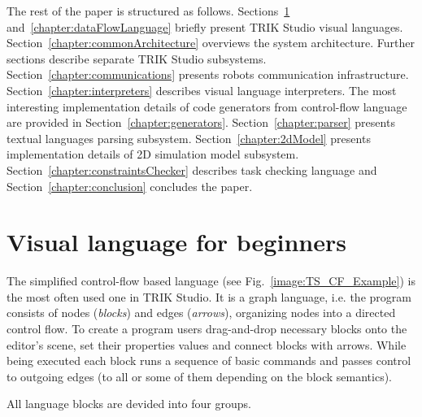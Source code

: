 \documentclass[conference]{IEEEtran}
\begin{document}
The rest of the paper is structured as follows. Sections~\ref{chapter:controlFlowLanguage} and~\ref{chapter:dataFlowLanguage} briefly present TRIK Studio visual languages. Section~\ref{chapter:commonArchitecture} overviews the system architecture. Further sections describe separate TRIK Studio subsystems. Section~\ref{chapter:communications} presents robots communication infrastructure. Section~\ref{chapter:interpreters} describes visual language interpreters. The most interesting implementation details of code generators from control-flow language are provided in Section~\ref{chapter:generators}. Section~\ref{chapter:parser} presents textual languages parsing subsystem. Section~\ref{chapter:2dModel} presents implementation details of 2D simulation model subsystem. Section~\ref{chapter:constraintsChecker} describes task checking language and Section~\ref{chapter:conclusion} concludes the paper.

\section{Visual language for beginners}
\label{chapter:controlFlowLanguage}

The simplified control-flow based language (see Fig.~\ref{image:TS_CF_Example}) is the most often used one in TRIK Studio. It is a graph language, i.e. the program consists of nodes (\textit{blocks}) and edges (\textit{arrows}), organizing nodes into a directed control flow. To create a program users drag-and-drop necessary blocks onto the editor's scene, set their properties values and connect blocks with arrows. While being executed each block runs a sequence of basic commands and passes control to outgoing edges (to all or some of them depending on the block semantics). 

All language blocks are devided into four groups.
\end{document}
